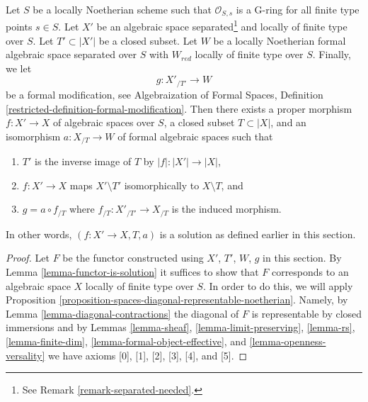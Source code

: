 \begin{theorem}
\label{theorem-contractions}
Let $S$ be a locally Noetherian scheme such that $\mathcal{O}_{S, s}$
is a G-ring for all finite type points $s \in S$. Let $X'$ be an algebraic
space separated\footnote{See Remark \ref{remark-separated-needed}.}
and locally of finite type over $S$. Let $T' \subset |X'|$ be a closed
subset. Let $W$ be a locally Noetherian formal algebraic space separated
over $S$ with $W_{red}$ locally of finite type over $S$. Finally, we let
$$
g : X'_{/T'} \longrightarrow W
$$
be a formal modification, see Algebraization of Formal Spaces, Definition
\ref{restricted-definition-formal-modification}. Then there exists a
proper morphism $f : X' \to X$ of algebraic spaces over $S$,
a closed subset $T \subset |X|$, and an isomorphism
$a : X_{/T} \to W$ of formal algebraic spaces such that
\begin{enumerate}
\item $T'$ is the inverse image of $T$ by $|f| : |X'| \to |X|$,
\item $f : X' \to X$ maps $X' \setminus T'$ isomorphically to
$X \setminus T$, and
\item $g = a \circ f_{/T}$ where $f_{/T} : X'_{/T'} \to X_{/T}$
is the induced morphism.
\end{enumerate}
In other words, $(f : X' \to X, T, a)$ is a solution as defined earlier in
this section.
\end{theorem}

\begin{proof}
Let $F$ be the functor constructed using $X'$, $T'$, $W$, $g$ in this section.
By Lemma \ref{lemma-functor-is-solution} it suffices to show that
$F$ corresponds to an algebraic space $X$ locally of finite type over $S$.
In order to do this, we will apply
Proposition \ref{proposition-spaces-diagonal-representable-noetherian}.
Namely, by Lemma \ref{lemma-diagonal-contractions}
the diagonal of $F$ is representable by closed immersions
and by
Lemmas \ref{lemma-sheaf}, \ref{lemma-limit-preserving},
\ref{lemma-rs}, \ref{lemma-finite-dim},
\ref{lemma-formal-object-effective}, and \ref{lemma-openness-versality}
we have axioms [0], [1], [2], [3], [4], and [5].
\end{proof}


